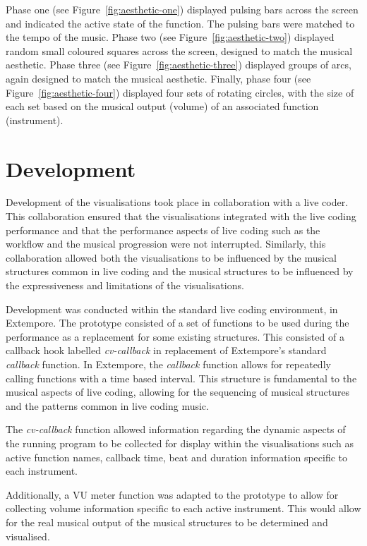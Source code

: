 Phase one (see Figure~\ref{fig:aesthetic-one}) displayed pulsing bars across the screen and indicated the active state of the function. The pulsing bars were matched to the tempo of the music. Phase two (see Figure~\ref{fig:aesthetic-two}) displayed random small coloured squares across the screen, designed to match the musical aesthetic. Phase three (see Figure~\ref{fig:aesthetic-three}) displayed groups of arcs, again designed to match the musical aesthetic. Finally, phase four (see Figure~\ref{fig:aesthetic-four}) displayed four sets of rotating circles, with the size of each set based on the musical output (volume) of an associated function (instrument).

\section{Development}

Development of the visualisations took place in collaboration with a live coder. This collaboration ensured that the visualisations integrated with the live coding performance and that the performance aspects of live coding such as the workflow and the musical progression were not interrupted. Similarly, this collaboration allowed both the visualisations to be influenced by the musical structures common in live coding and the musical structures to be influenced by the expressiveness and limitations of the visualisations.

Development was conducted within the standard live coding environment, in Extempore. The prototype consisted of a set of functions to be used during the performance as a replacement for some existing structures. This consisted of a callback hook labelled \textit{cv-callback} in replacement of Extempore's standard \textit{callback} function. In Extempore, the \textit{callback} function allows for repeatedly calling functions with a time based interval. This structure is fundamental to the musical aspects of live coding, allowing for the sequencing of musical structures and the patterns common in live coding music.

The \textit{cv-callback} function allowed information regarding the dynamic aspects of the running program to be collected for display within the visualisations such as active function names, callback time, beat and duration information specific to each instrument.

Additionally, a \ac{VU} meter function was adapted to the prototype to allow for collecting volume information specific to each active instrument. This would allow for the real musical output of the musical structures to be determined and visualised.

